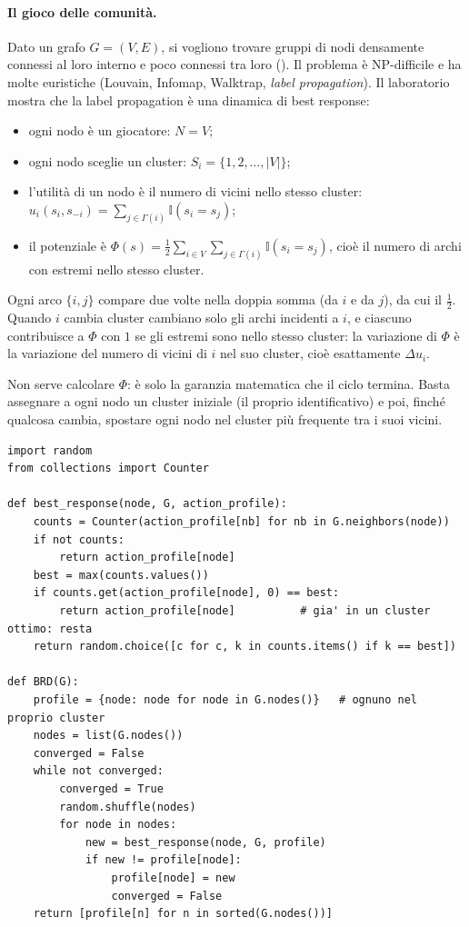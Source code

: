 \paragraph{Il gioco delle comunità.}
Dato un grafo $G = (V,E)$, si vogliono trovare gruppi di nodi densamente connessi al loro
interno e poco connessi tra loro (). Il problema è NP-difficile e
ha molte euristiche (Louvain, Infomap, Walktrap, \emph{label propagation}). Il laboratorio
mostra che la label propagation è una dinamica di best response:
\begin{itemize}
  \item ogni nodo è un giocatore: $N = V$;
  \item ogni nodo sceglie un cluster: $S_i = \{1, 2, \dots, |V|\}$;
  \item l'utilità di un nodo è il numero di vicini nello stesso cluster:
        $u_i(s_i, s_{-i}) = \sum_{j \in \Gamma(i)} \mathbb{I}(s_i = s_j)$;
  \item il potenziale è $\Phi(s) = \tfrac12 \sum_{i \in V} \sum_{j \in \Gamma(i)}
        \mathbb{I}(s_i = s_j)$, cioè il numero di archi con estremi nello stesso cluster.
\end{itemize}

\begin{extra}
Ogni arco $\{i,j\}$ compare due volte nella doppia somma (da $i$ e da $j$), da cui il
$\tfrac12$. Quando $i$ cambia cluster cambiano solo gli archi incidenti a $i$, e ciascuno
contribuisce a $\Phi$ con $1$ se gli estremi sono nello stesso cluster: la variazione di
$\Phi$ è la variazione del numero di vicini di $i$ nel suo cluster, cioè esattamente
$\Delta u_i$.
\end{extra}

Non serve calcolare $\Phi$: è solo la garanzia matematica che il ciclo termina. Basta
assegnare a ogni nodo un cluster iniziale (il proprio identificativo) e poi, finché qualcosa
cambia, spostare ogni nodo nel cluster più frequente tra i suoi vicini.

\begin{lstlisting}
import random
from collections import Counter

def best_response(node, G, action_profile):
    counts = Counter(action_profile[nb] for nb in G.neighbors(node))
    if not counts:
        return action_profile[node]
    best = max(counts.values())
    if counts.get(action_profile[node], 0) == best:
        return action_profile[node]          # gia' in un cluster ottimo: resta
    return random.choice([c for c, k in counts.items() if k == best])

def BRD(G):
    profile = {node: node for node in G.nodes()}   # ognuno nel proprio cluster
    nodes = list(G.nodes())
    converged = False
    while not converged:
        converged = True
        random.shuffle(nodes)
        for node in nodes:
            new = best_response(node, G, profile)
            if new != profile[node]:
                profile[node] = new
                converged = False
    return [profile[n] for n in sorted(G.nodes())]
\end{lstlisting}

